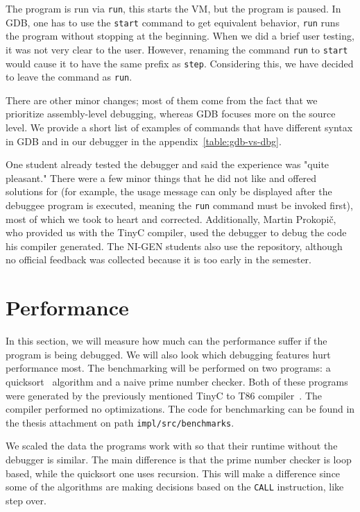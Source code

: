 The program is run via \texttt{run}, this starts the VM, but the program is
paused. In GDB, one has to use the \texttt{start} command to get equivalent
behavior, \texttt{run} runs the program without stopping at the beginning. When
we did a brief user testing, it was not very clear to the user. However,
renaming the command \texttt{run} to \texttt{start} would cause it to have the
same prefix as \texttt{step}. Considering this, we have decided to leave the
command as \texttt{run}.

There are other minor changes; most of them come from the fact that we
prioritize assembly-level debugging, whereas GDB focuses more on the source
level. We provide a short list of examples of commands that have different
syntax in GDB and in our debugger in the appendix~\ref{table:gdb-vs-dbg}.

One student already tested the debugger and said the experience was "quite
pleasant." There were a few minor things that he did not like and offered
solutions for (for example, the usage message can only be displayed after the
debuggee program is executed, meaning the \texttt{run} command must be invoked
first), most of which we took to heart and corrected. Additionally, Martin
Prokopič, who provided us with the TinyC compiler, used the debugger to debug
the code his compiler generated. The NI-GEN students also use the repository,
although no official feedback was collected because it is too early in the
semester.

\section{Performance}\label{section:benchmark}
In this section, we will measure how much can the performance suffer if the
program is being debugged. We will also look which debugging features hurt
performance most. The benchmarking will be performed on two programs: a
quicksort~\cite{quicksort} algorithm and a naive prime number checker. Both of
these programs were generated by the previously mentioned TinyC to T86
compiler~\cite{martintinyc}. The compiler performed no optimizations. The code for
benchmarking can be found in the thesis attachment on path
\texttt{impl/src/benchmarks}.

We scaled the data the programs work with so that their runtime without the
debugger is similar. The main difference is that the prime number checker is
loop based, while the quicksort one uses recursion. This will make a difference
since some of the algorithms are making decisions based on the \texttt{CALL}
instruction, like step over.

